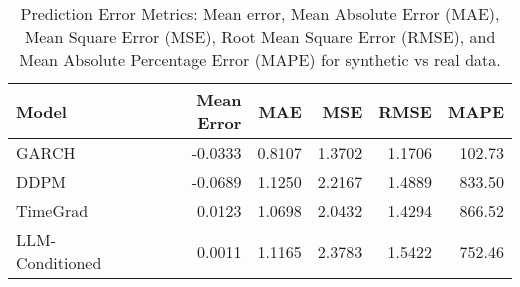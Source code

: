 \begin{table}[htbp]
\centering
\begin{tabular}{lrrrrr}
\toprule
Model & Mean Error & MAE & MSE & RMSE & MAPE \\
\midrule
GARCH & -0.0333 & 0.8107 & 1.3702 & 1.1706 & 102.73 \\
DDPM & -0.0689 & 1.1250 & 2.2167 & 1.4889 & 833.50 \\
TimeGrad & 0.0123 & 1.0698 & 2.0432 & 1.4294 & 866.52 \\
LLM-Conditioned & 0.0011 & 1.1165 & 2.3783 & 1.5422 & 752.46 \\
\bottomrule
\end{tabular}
\caption{Prediction Error Metrics: Mean error, Mean Absolute Error (MAE), Mean Square Error (MSE), Root Mean Square Error (RMSE), and Mean Absolute Percentage Error (MAPE) for synthetic vs real data.}
\label{tab:prediction_error_metrics}
\end{table}
